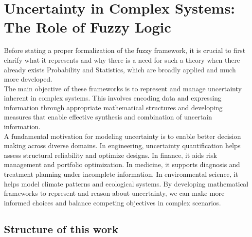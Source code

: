 \chapter{Uncertainty in Complex Systems: The Role of Fuzzy Logic}
\label{ch:intro}


Before stating a proper formalization of the fuzzy framework, it is crucial to first clarify what it represents and why there is a need for such a theory when there already exists Probability and Statistics, which are broadly applied and much more developed.\\

The main objective of these frameworks is to represent and manage uncertainty inherent in complex systems. This involves encoding data and expressing information through appropriate mathematical structures and developing measures that enable effective synthesis and combination of uncertain information.\\

A fundamental motivation for modeling uncertainty is to enable better decision making across diverse domains. In engineering, uncertainty quantification helps assess structural reliability and optimize designs. In finance, it aids risk management and portfolio optimization. In medicine, it supports diagnosis and treatment planning under incomplete information. In environmental science, it helps model climate patterns and ecological systems. By developing mathematical frameworks to represent and reason about uncertainty, we can make more informed choices and balance competing objectives in complex scenarios.\\



 



\section{Structure of this work}

